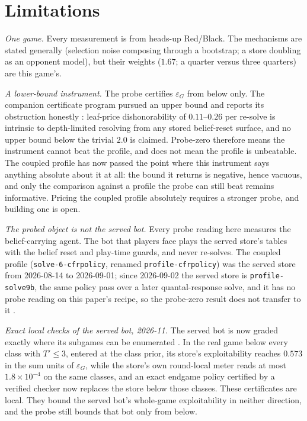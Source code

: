 \documentclass[11pt]{article}
\theoremstyle{plain}
\theoremstyle{definition}
\theoremstyle{remark}
\newcommand{\code}[1]{\texttt{\small #1}}
\newcommand{\game}{\ensuremath{G}}
\newcommand{\epsG}{\ensuremath{\varepsilon_{\game}}}
\begin{document}
\section{Limitations}\label{sec:limits}

\emph{One game.} Every measurement is from heads-up Red/Black. The
mechanisms are stated generally (selection noise composing through a
bootstrap; a store doubling as an opponent model), but their weights
($1.67$; a quarter versus three quarters) are this game's.

\emph{A lower-bound instrument.} The probe certifies $\epsG$ from below
only. The companion certificate program pursued an upper bound and
reports its obstruction honestly \cite{rb3}: leaf-price dishonorability
of $0.11$--$0.26$ per re-solve is intrinsic to depth-limited resolving
from any stored belief-reset surface, and no upper bound below the
trivial $2.0$ is claimed. Probe-zero therefore means the instrument
cannot beat the profile, and does not mean the profile is unbeatable.
The coupled profile has now passed the point where this instrument
says anything absolute about it at all: the bound it returns is
negative, hence vacuous, and only the comparison against a profile the
probe can still beat remains informative. Pricing the coupled profile
absolutely requires a stronger probe, and building one is open.

\emph{The probed object is not the served bot.} Every probe reading
here measures the belief-carrying agent. The bot that players face
plays the served store's tables with the belief reset and play-time
guards, and never re-solves. The coupled profile
(\code{solve-6-cfrpolicy}, renamed \code{profile-cfrpolicy}) was the
served store from 2026-08-14 to 2026-09-01; since 2026-09-02 the
served store is \code{profile-solve9b}, the same policy pass over a
later quantal-response solve, and it has no probe reading on this
paper's recipe, so the probe-zero result does not transfer to it
\cite{rb3}.

\emph{Exact local checks of the served bot, 2026-11.} The served bot is
now graded exactly where its subgames can be enumerated \cite{rb3}. In
the real game below every class with $T'\le3$, entered at the class
prior, its store's exploitability reaches $0.573$ in the sum units of
$\epsG$, while the store's own round-local meter reads at most
$1.8\times10^{-4}$ on the same classes, and an exact endgame policy
certified by a verified checker now replaces the store below those
classes. These certificates are local. They bound the served bot's
whole-game exploitability in neither direction, and the probe still
bounds that bot only from below.
\end{document}
